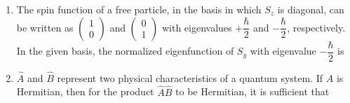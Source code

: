 \documentclass[14pt, a4paper]{extarticle}
\begin{document}
\begin{enumerate}[label=\textbf{Q. \arabic*}, start=21]
\item The spin function of a free particle, in the basis in which $S_z$ is diagonal, can be written as
$\begin{pmatrix} 1 \\ 0 \end{pmatrix}$ and $\begin{pmatrix} 0 \\ 1 \end{pmatrix}$ with eigenvalues $+\dfrac{\hbar}{2}$ and $-\dfrac{\hbar}{2}$, respectively. In the given basis, the normalized eigenfunction of $S_y$ with eigenvalue $-\dfrac{\hbar}{2}$ is
\begin{enumerate}[label=(\Alph*)]
\end{enumerate}

\item $\hat{A}$ and $\hat{B}$ represent two physical characteristics of a quantum system. If $\hat{A}$ is Hermitian, then for the product $\hat{A}\hat{B}$ to be Hermitian, it is sufficient that
\begin{enumerate}[label=(\Alph*)]
\end{enumerate}


\end{enumerate}
\end{document}
